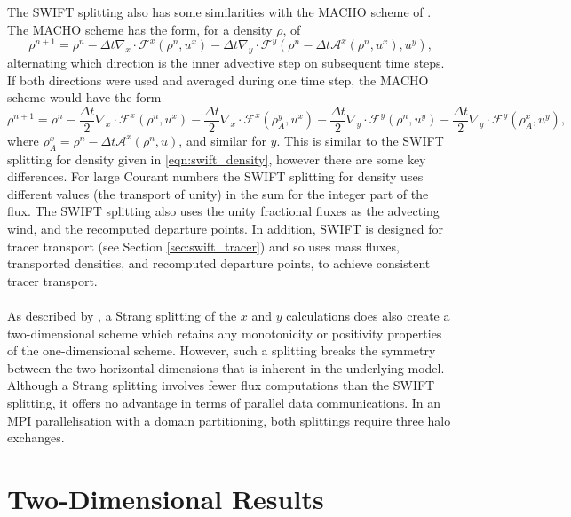 \documentclass[11pt,a4paper]{article}
\begin{document}
The SWIFT splitting also has some similarities with the MACHO scheme of \cite{leonard1996cosmic}. The MACHO scheme has the form, for a density $\rho$, of
\begin{equation}
    \rho^{n+1} = \rho^{n} - \Delta{t} \nabla_x\cdot \mathcal{F}^x(\rho^n,u^x) - \Delta{t} \nabla_y\cdot \mathcal{F}^y(\rho^{n} - \Delta{t} \mathcal{A}^x(\rho^n,u^x),u^y),
\end{equation}
alternating which direction is the inner advective step on subsequent time steps. If both directions were used and averaged during one time step, the MACHO scheme would have the form
\begin{equation}
    \rho^{n+1} = \rho^{n} - \frac{\Delta{t}}{2} \nabla_x\cdot \mathcal{F}^x(\rho^n,u^x) - \frac{\Delta{t}}{2} \nabla_x\cdot \mathcal{F}^x(\rho^y_A,u^x)- \frac{\Delta{t}}{2} \nabla_y\cdot \mathcal{F}^y(\rho^n,u^y) - \frac{\Delta{t}}{2} \nabla_y\cdot \mathcal{F}^y(\rho^x_A,u^y),
\end{equation}
where $\rho^x_A = \rho^n - \Delta{t} \mathcal{A}^x(\rho^n,u)$, and similar for $y$. This is similar to the SWIFT splitting for density given in \eqref{eqn:swift_density}, however there are some key differences. For large Courant numbers the SWIFT splitting for density uses different values (the transport of unity) in the sum for the integer part of the flux. The SWIFT splitting also uses the unity fractional fluxes as the advecting wind, and the recomputed departure points. In addition, SWIFT is designed for tracer transport (see Section \ref{sec:swift_tracer}) and so uses mass fluxes, transported densities, and recomputed departure points, to achieve consistent tracer transport. \\
\\
As described by \citet{skamarock2006limiters}, a Strang splitting of the $x$ and $y$ calculations does also create a two-dimensional scheme which retains any monotonicity or positivity properties of the one-dimensional scheme.
However, such a splitting breaks the symmetry between the two horizontal dimensions that is inherent in the underlying model.
Although a Strang splitting involves fewer flux computations than the SWIFT splitting, it offers no advantage in terms of parallel data communications.
In an MPI parallelisation with a domain partitioning, both splittings require three halo exchanges.

\section{Two-Dimensional Results} \label{sec:resultd2d}
\end{document}
